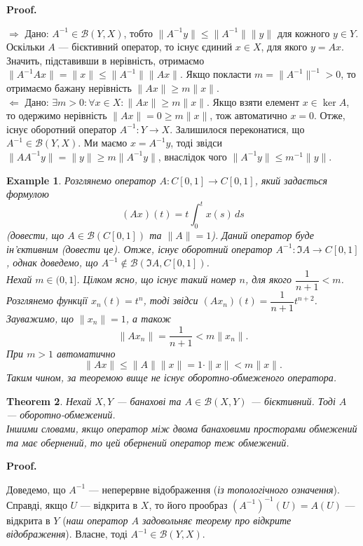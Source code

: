 \documentclass[a4paper, 10pt]{article}
\makeatletter
\def\rightproof{$\boxed{\Rightarrow}$ }
\def\leftproof{$\boxed{\Leftarrow}$ }
\theoremstyle{theoremdd}
\newtheorem{theorem}{Theorem}[subsection]
\theoremstyle{theoremdd}
\theoremstyle{theoremdd}
\theoremstyle{theoremdd}
\newtheorem{example}[theorem]{Example}
\theoremstyle{theoremdd}
\theoremstyle{theoremdd}
\theoremstyle{theoremdd}
\theoremstyle{theoremdd}
\renewenvironment{proof}[1][Proof.\\]{\par
\pushQED{\hfill \qed}%
\normalfont \topsep6\p@\@plus6\p@\relax
\trivlist
\item\relax
{\bfseries
#1\@addpunct{.}}\hspace\labelsep\ignorespaces
}{%
\popQED\endtrivlist\@endpefalse
}
\makeatother
\begin{document}
\begin{proof}
\rightproof Дано: $A^{-1} \in \mathcal{B}(Y,X)$, тобто $\|A^{-1}y\| \leq \|A^{-1}\| \|y\|$ для кожного $y \in Y$. Оскільки $A$ --- бієктивний оператор, то існує єдиний $x \in X$, для якого $y = Ax$. Значить, підставивши в нерівність, отримаємо $\|A^{-1} Ax\| = \|x\| \leq \|A^{-1}\| \|Ax\|$. Якщо покласти $m = \|A^{-1}\|^{-1} > 0$, то отримаємо бажану нерівність $\|Ax\| \geq m\|x\|$.
\bigskip \\
\leftproof Дано: $\exists m > 0: \forall x \in X: \|Ax\| \geq m\|x\|$. Якщо взяти елемент $x \in \ker A$, то одержимо нерівність $\|Ax\| = 0 \geq m \|x\|$, тож автоматично $x = 0$. Отже, існує оборотний оператор $A^{-1} \colon Y \to X$. Залишилося переконатися, що $A^{-1} \in \mathcal{B}(Y,X)$. Ми маємо $x = A^{-1}y$, тоді звідси $\|AA^{-1}y\| = \|y\| \geq m \|A^{-1}y\|$, внаслідок чого $\|A^{-1}y\| \leq m^{-1} \|y\|$.
\end{proof}

\begin{example}
Розглянемо оператор $A \colon C[0,1] \to C[0,1]$, який задається формулою
\[
(Ax)(t) = t \int_0^t x(s)\,ds
\]
(\textit{довести, що $A \in \mathcal{B}(C[0,1])$ та $\|A\| = 1$}). Даний оператор буде ін'єктивним (\textit{довести це}). Отже, існує оборотний оператор $A^{-1} \colon \Im A \to C[0,1]$, однак доведемо, що $A^{-1} \notin \mathcal{B}(\Im A, C[0,1])$.\\
Нехай $m \in (0,1]$. Цілком ясно, що існує такий номер $n$, для якого $\dfrac{1}{n+1} < m$. Розглянемо функції $x_n(t) = t^n$, тоді звідси $(Ax_n)(t) = \dfrac{1}{n+1} t^{n+2}$. Зауважимо, що $\|x_n\| = 1$, а також
\[
\| Ax_n \| = \dfrac{1}{n+1} < m \| x_n\|.
\]
При $m > 1$ автоматично \[
\|A x \| \leq \|A\| \|x\| = 1 \cdot \|x\| < m \|x\|.
\]
Таким чином, за теоремою вище не існує оборотно-обмеженого оператора. 
\end{example}

\begin{theorem}
Нехай $X,Y$ --- банахові та $A \in \mathcal{B}(X,Y)$ --- бієктивний. Тоді $A$ --- оборотно-обмежений.\\
\textit{Іншими словами, якщо оператор між двома банаховими просторами обмежений та має обернений, то цей обернений оператор теж обмежений.}
\end{theorem}

\begin{proof}
Доведемо, що $A^{-1}$ --- неперервне відображення (\textit{із топологічного означення}). Справді, якщо $U$ --- відкрита в $X$, то його прообраз $(A^{-1})^{-1}(U) = A(U)$ --- відкрита в $Y$ (\textit{наш оператор $A$ задовольняє теорему про відкрите відображення}). Власне, тоді $A^{-1} \in \mathcal{B}(Y,X)$.
\end{proof}
\noindent
\end{document}
